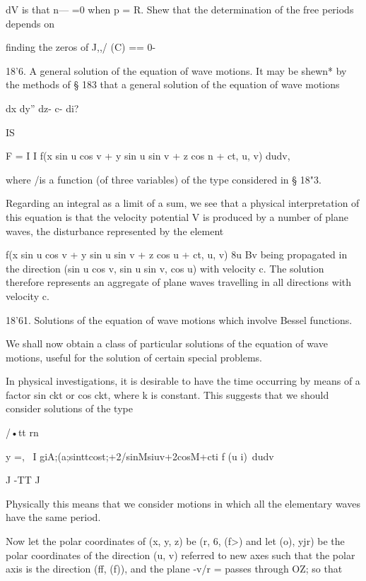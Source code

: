 dV 
is that n— =0 when p = R. Shew that the determination of the free periods depends on 

finding the zeros of J,,/ (C) == 0- 

18'6. A general solution of the equation of wave motions. 
It may be shewn* by the methods of § 183 that a general solution of 
the equation of wave motions 

dx  dy'' dz- c- di? 



IS 



F = I I f(x sin u cos v + y sin u sin v + z cos n + ct, u, v) dudv, 



where /is a function (of three variables) of the type considered in § 18"3. 

Regarding an integral as a limit of a sum, we see that a physical 
interpretation of this equation is that the velocity potential V is produced 
by a number of plane waves, the disturbance represented by the element 

f(x sin u cos v + y sin u sin v + z cos u + ct, u, v) 8u Bv 
being propagated in the direction (sin u cos v, sin u sin v, cos u) with velocity c. 
The solution therefore represents an aggregate of plane waves travelling in 
all directions with velocity c. 

18'61. Solutions of the equation of wave motions which involve Bessel 
functions. 

We shall now obtain a class of particular solutions of the equation of 
wave motions, useful for the solution of certain special problems. 

In physical investigations, it is desirable to have the time occurring by 
means of a factor sin ckt or cos ckt, where k is constant. This suggests that 
we should consider solutions of the type 

/•tt rn 

y  =, \ I giA;(a;sinttcost;+2/sinMsiuv+2cosM+cti f (u i)\ dudv 

J -TT J 

Physically this means that we consider motions in which all the elementary waves 
have the same period. 

Now let the polar coordinates of (x, y, z) be (r, 6, (f>) and let (o), yjr) be the 
polar coordinates of the direction (u, v) referred to new axes such that 
the polar axis is the direction (ff, (f)), and the plane -v/r = passes through 
OZ; so that 

